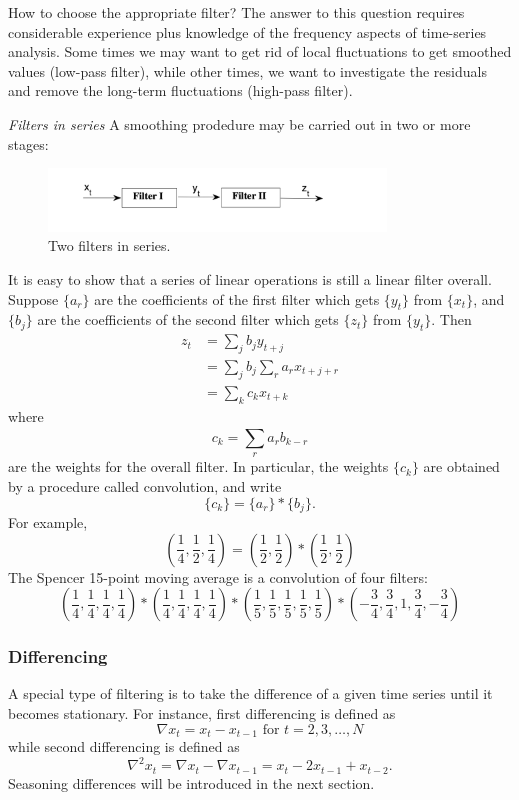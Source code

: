 How to choose the appropriate filter? The answer to this question requires considerable experience plus knowledge of the frequency aspects of time-series analysis. Some times we may want to get rid of local fluctuations to get smoothed values (low-pass filter), while other times, we want to investigate the residuals and remove the long-term fluctuations (high-pass filter).

\textit{Filters in series}
A smoothing prodedure may be carried out in two or more stages:
\begin{figure}[h]
	\centering
	\includegraphics[width=0.8\textwidth]{Chapter 2/fig2-2.png}
	\caption{Two filters in series.}
	\label{fig:2.2}
\end{figure}

It is easy to show that a series of linear operations is still a linear filter overall. Suppose $\{ a_r \}$ are the coefficients of the first filter which gets $\{ y_t \}$ from $\{ x_t \}$, and $\{ b_j \}$ are the coefficients of the second filter which gets $\{ z_t \}$ from $\{ y_t \}$. Then 
\begin{align*}
	z_t 
	&= \sum_{j}^{} b_jy_{t+j} \\
	&= \sum_{j}^{} b_j \sum_{r}^{} a_r x_{t+j+r} \\
	&= \sum_{k}^{} c_kx_{t+k}
\end{align*}
where
\[ c_k = \sum_{r}^{} a_rb_{k-r} \]
are the weights for the overall filter. In particular, the weights $\{ c_k \}$ are obtained by a procedure called convolution, and write 
\[ \{ c_k \} = \{ a_r \} * \{ b_j \}. \]
For example, 
\[ \left( \frac{1}{4}, \frac{1}{2}, \frac{1}{4} \right) = \left( \frac{1}{2}, \frac{1}{2} \right) * 
\left( \frac{1}{2}, \frac{1}{2} \right) \]
The Spencer 15-point moving average is a convolution of four filters:
\[ \left( \frac{1}{4},\frac{1}{4},\frac{1}{4},\frac{1}{4} \right) 
* \left( \frac{1}{4},\frac{1}{4},\frac{1}{4},\frac{1}{4} \right) 
* \left( \frac{1}{5},\frac{1}{5},\frac{1}{5},\frac{1}{5}, \frac{1}{5} \right) 
* \left( -\frac{3}{4},\frac{3}{4},1,\frac{3}{4},-\frac{3}{4} \right) \]


\subsubsection{Differencing}
A special type of filtering is to take the difference of a given time series until it becomes stationary. For instance, first differencing is defined as 
\[ \nabla x_t = x_t - x_{t-1} \text{ for } t = 2, 3, \dots, N \]
while second differencing is defined as 
\[ \nabla^2 x_t = \nabla x_t - \nabla x_{t-1} = x_t - 2x_{t-1} + x_{t-2}. \]
Seasoning differences will be introduced in the next section.


